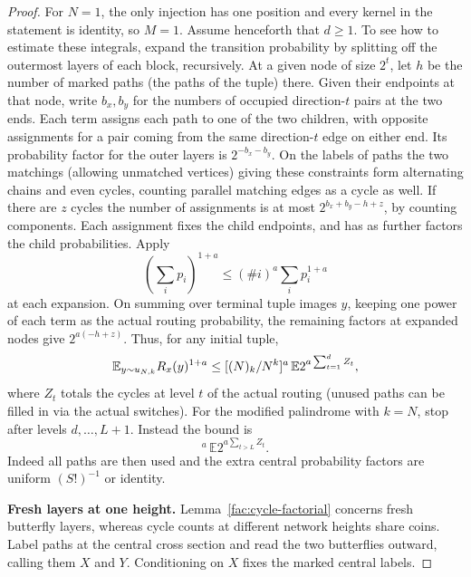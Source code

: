 \begin{lemma}
\begin{itemize}
\end{itemize}\end{lemma}\begin{proof}
For $N=1$, the only injection has one position and every kernel in the
statement is identity, so $M=1$. Assume henceforth that $d\ge1$.
To see how to estimate these integrals, expand the transition probability by splitting off the outermost layers of each block, recursively. At a given node of size $2^t$, let $h$ be the number of marked paths (the paths of the tuple) there. Given their endpoints at that node, write $b_x,b_y$ for the numbers of occupied direction-$t$ pairs at the two ends. Each term assigns each path to one of the two children, with opposite assignments for a pair coming from the same direction-$t$ edge on either end. Its probability factor for the outer layers is $2^{-b_x-b_y}$. On the labels of paths the two matchings (allowing unmatched vertices) giving these constraints form alternating chains and even cycles, counting parallel matching edges as a cycle as well. If there are $z$ cycles the number of assignments is at most $2^{b_x+b_y-h+z}$, by counting components. Each assignment fixes the child endpoints, and has as further factors the child probabilities. Apply
\[
(\sum_i p_i)^{1+a}\le (\# i)^a\sum_i p_i^{1+a}
\]
at each expansion. On summing over terminal tuple images $y$, keeping one power of each term as the actual routing probability, the remaining factors at expanded nodes give $2^{a(-h+z)}$. Thus, for any initial tuple,
\begin{equation}
\mathbb E_{y\sim u_{N,k}} R_x(y)^{1+a}
 \le [(N)_k/N^k]^a\,\mathbb E 2^{a\sum_{t=1}^d Z_t},
\label{fac:e1}
\end{equation}
where $Z_t$ totals the cycles at level $t$ of the actual routing (unused paths can be filled in via the actual switches). For the modified palindrome with $k=N$, stop after levels $d,\ldots,L+1$. Instead the bound is
\begin{equation}
[N!\,(S/N)^N (S!)^{-N/S+b}]^a\,\mathbb E 2^{a\sum_{t>L} Z_t}.
\label{fac:e2}
\end{equation}
Indeed all paths are then used and the extra central probability factors are uniform $(S!)^{-1}$ or identity.

\medskip\noindent\textbf{Fresh layers at one height.}\enspace
Lemma~\ref{fac:cycle-factorial} concerns fresh butterfly layers, whereas
cycle counts at different network heights share coins. Label paths at the
central cross section and read the two butterflies outward, calling them
$X$ and $Y$. Conditioning on $X$ fixes the marked central labels.


\end{proof}
